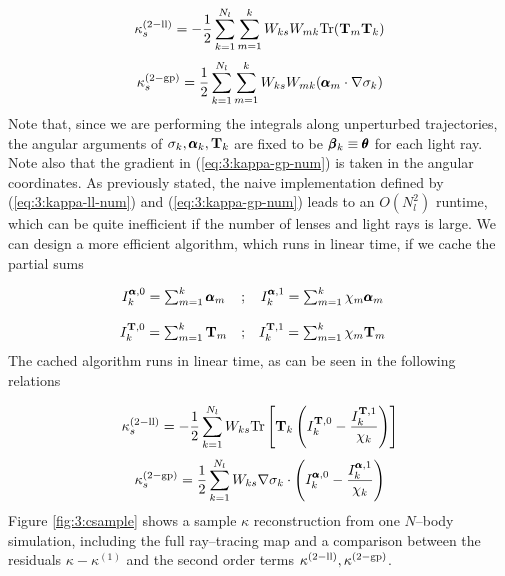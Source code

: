 \begin{equation}
\label{eq:3:kappa-ll-num}
\kappa_s^{(2-{\rm ll})} = -\frac{1}{2}\sum_{k=1}^{N_l}\sum_{m=1}^k W_{ks}W_{mk} {\rm Tr}(\mathbf{T}_m\mathbf{T}_k)
\end{equation}
%
\begin{equation}
\label{eq:3:kappa-gp-num}
\kappa_s^{(2-{\rm gp})} = \frac{1}{2}\sum_{k=1}^{N_l}\sum_{m=1}^k W_{ks}W_{mk} (\pmb{\alpha}_m\cdot\nabla\sigma_k)
\end{equation}
%
Note that, since we are performing the integrals along unperturbed trajectories, the angular arguments of $\sigma_k,\pmb{\alpha}_k,\mathbf{T}_k$ are fixed to be $\pmb{\beta}_k\equiv\pmb{\theta}$ for each light ray. Note also that the gradient in (\ref{eq:3:kappa-gp-num}) is taken in the angular coordinates. As previously stated, the naive implementation defined by (\ref{eq:3:kappa-ll-num}) and (\ref{eq:3:kappa-gp-num}) leads to an $O(N_l^2)$ runtime, which can be quite inefficient if the number of lenses and light rays is large. We can design a more efficient algorithm, which runs in linear time, if we cache the partial sums 

\begin{equation}
\label{eq:3:cache}
\begin{matrix}
I^{\pmb{\alpha},0}_k = \sum_{m=1}^k \pmb{\alpha}_m & ; & I^{\pmb{\alpha},1}_k = \sum_{m=1}^k \chi_m\pmb{\alpha}_m & \\ \\
I^{\mathbf{T},0}_k = \sum_{m=1}^k \mathbf{T}_m & ; & I^{\mathbf{T},1}_k = \sum_{m=1}^k \chi_m\mathbf{T}_m 
\end{matrix} 
\end{equation} 
%
The cached algorithm runs in linear time, as can be seen in the following relations   

\begin{equation}
\label{eq:3:kappa-ll-num-lin}
\kappa_s^{(2-{\rm ll})} = -\frac{1}{2}\sum_{k=1}^{N_l} W_{ks} {\rm Tr}\left[\mathbf{T}_k\left(I^{\mathbf{T},0}_k-\frac{I^{\mathbf{T},1}_k}{\chi_k}\right)\right]
\end{equation}
%
\begin{equation}
\label{eq:3:kappa-gp-num-lin}
\kappa_s^{(2-{\rm gp})} = \frac{1}{2}\sum_{k=1}^{N_l} W_{ks}\nabla\sigma_k\cdot\left(I^{\pmb{\alpha},0}_k - \frac{I^{\pmb{\alpha},1}_k}{\chi_k}\right)
\end{equation}
%
Figure \ref{fig:3:csample} shows a sample $\kappa$ reconstruction from one $N$--body simulation, including the full ray--tracing map and a comparison between the residuals $\kappa-\kappa^{(1)}$ and the second order terms $\kappa^{(2-{\rm ll})},\kappa^{(2-{\rm gp})}$. 

